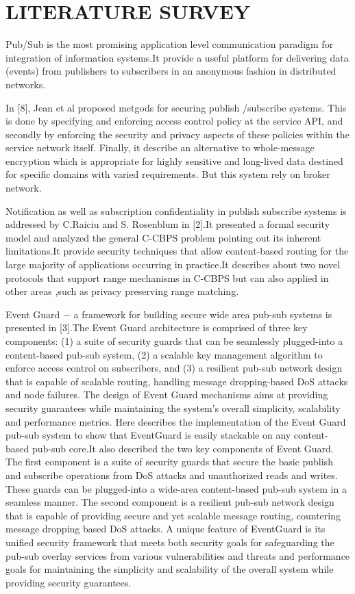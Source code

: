 \documentclass[MTech]{iitmdiss}
\begin{document}
\chapter{LITERATURE SURVEY}
\label{chap:lit} Pub/Sub is the most promising application level communication paradigm for integration of information systems.It provide a useful platform for delivering data (events) from publishers to
subscribers in an anonymous fashion in distributed networks.

In [8], Jean et al  proposed metgods for securing publish /subscribe systems. This is done by specifying and enforcing access control policy at the service API, and secondly by enforcing the security and privacy aspects of these policies within the service network itself. Finally, it describe an alternative to
whole-message encryption which is  appropriate for highly sensitive
and long-lived data destined for specific domains with varied requirements.
 But this system rely on broker network.
 
 Notification as well as subscription confidentiality in publish subscribe systems is addressed by C.Raiciu and S. Rosenblum in [2].It presented a formal security model and analyzed the general C-CBPS problem pointing out its inherent limitations.It provide security techniques that allow content-based routing for the large majority of applications occurring in practice.It describes about two novel protocols that support  range mechanisms in C-CBPS but can also applied in other areas ,such as privacy preserving range matching.
 
 Event Guard − a framework for building secure wide area pub-sub systems is presented in [3].The Event Guard architecture is comprised of three
key components: (1) a suite of security guards that can be seamlessly plugged-into a content-based pub-sub system, (2) a scalable key management algorithm to enforce access control on
subscribers, and (3) a resilient pub-sub network design that is capable of scalable routing, handling
message dropping-based DoS attacks and node failures. The design of Event Guard mechanisms
aims at providing security guarantees while maintaining the system's overall simplicity, scalability and performance metrics. Here describes the implementation of the Event  Guard pub-sub system to show that EventGuard is easily stackable on any content-based pub-sub core.It also  described the two key components of Event Guard. The first component is a suite of security guards that secure the basic publish and subscribe operations from DoS attacks and unauthorized reads and writes. These guards can be plugged-into a wide-area content-based
pub-sub system in a seamless manner. The second component is a resilient pub-sub
network design that is capable of providing secure and yet scalable  message routing,
countering message dropping based DoS attacks. A unique feature of EventGuard
is its unified security framework that meets both security goals for safeguarding the
pub-sub overlay services from various vulnerabilities and threats and performance
goals for maintaining the simplicity and scalability of the overall system while providing security guarantees.
\end{document}
